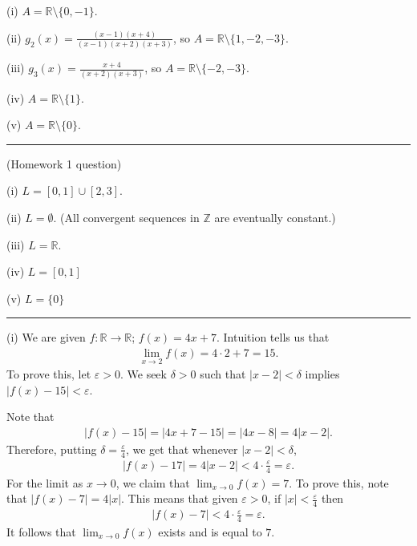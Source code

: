 \documentclass[letterpaper,10pt,english]{jupyterBook}
\begin{document}
\sphinxAtStartPar
(i) \(A=\mathbb{R} \setminus \{0, -1\}\).

\sphinxAtStartPar
(ii) \(g_{2}(x) = \displaystyle\frac{(x-1)(x+4)}{(x-1)(x+2)(x+3)}\), so \(A=\mathbb{R} \setminus \{1, -2, -3\}\).

\sphinxAtStartPar
(iii) \(g_{3}(x) = \displaystyle\frac{x+4}{(x+2)(x+3)}\), so \(A=\mathbb{R} \setminus \{-2, -3\}\).

\sphinxAtStartPar
(iv) \(A=\mathbb{R} \setminus \{1\}\).

\sphinxAtStartPar
(v) \(A=\mathbb{R} \setminus \{0\}\).


\bigskip\hrule\bigskip


\sphinxAtStartPar
{\hyperref[\detokenize{Problems:id2}]{}} (Homework 1 question)

\sphinxAtStartPar
(i) \(L=[0,1]\cup[2,3]\).

\sphinxAtStartPar
(ii) \(L=\emptyset\).  (All convergent sequences in \(\mathbb{Z}\) are eventually constant.)

\sphinxAtStartPar
(iii) \(L=\mathbb{R}\).

\sphinxAtStartPar
(iv) \(L=[0,1]\)

\sphinxAtStartPar
(v) \(L=\{0\}\)


\bigskip\hrule\bigskip


\sphinxAtStartPar
{\hyperref[\detokenize{Problems:id3}]{}} (i) We are given \(f:\mathbb{R}\to\mathbb{R}\); \(f(x)=4x+7\). Intuition tells us that
\begin{equation*}
\begin{split}
\lim_{x\rightarrow 2}f(x) = 4\cdot 2+7 = 15.
\end{split}
\end{equation*}
\sphinxAtStartPar
To prove this, let \(\varepsilon>0\). We seek \(\delta>0\) such that \(|x-2|<\delta\) implies \(|f(x)-15|<\varepsilon\).

\sphinxAtStartPar
Note that
\begin{equation*}
\begin{split}
|f(x)-15| = |4x+7-15| = |4x-8| = 4|x-2|.
\end{split}
\end{equation*}
\sphinxAtStartPar
Therefore, putting \(\delta=\frac{\varepsilon}{4}\), we get that whenever \(|x-2|<\delta\),
\begin{equation*}
\begin{split}
|f(x)-17| = 4|x-2| < 4\cdot\frac{\varepsilon}{4} = \varepsilon.
\end{split}
\end{equation*}
\sphinxAtStartPar
For the limit as \(x\rightarrow 0\), we claim that \(\lim_{x\rightarrow 0}f(x)=7\). To prove this, note that \(|f(x)-7|=4|x|\). This means that given \(\varepsilon>0\), if \(|x|<\frac{\varepsilon}{4}\) then
\begin{equation*}
\begin{split}
|f(x)-7|<4\cdot\frac{\varepsilon}{4} = \varepsilon.
\end{split}
\end{equation*}
\sphinxAtStartPar
It follows that \(\lim_{x\rightarrow 0}f(x)\) exists and is equal to \(7\).
\end{document}
